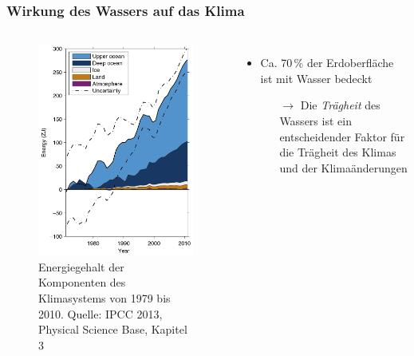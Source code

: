 \begin{frame}
	\frametitle{Wirkung des Wassers auf das Klima}
	\begin{columns}[c]
			\begin{figure}
				\includegraphics[scale=0.6]{bilder/hydrosphere_energy-in-components.jpg}
				\caption{Energiegehalt der Komponenten des Klimasystems von 1979 bis 2010. Quelle: IPCC 2013, Physical Science Base, Kapitel 3}
			\end{figure}
			\begin{itemize}
				\item Ca. 70\,\% der Erdoberfläche ist mit Wasser bedeckt
				\begin{itemize}
					\item[$\rightarrow$] Die \textit{Trägheit} des Wassers ist ein entscheidender Faktor für die Trägheit des Klimas und der Klimaänderungen %

\end{itemize}
\end{itemize}
\end{columns}
\end{frame}
